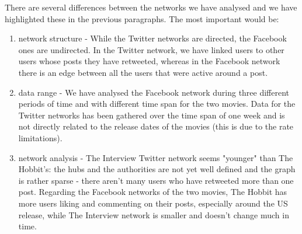 \documentclass{llncs}
\begin{document}
There are several differences between the networks we have analysed and we have
highlighted these in the previous paragraphs. The most important would be:
\begin{enumerate}
\item network structure - While the Twitter networks are directed, the Facebook
    ones are undirected. In the Twitter network, we have linked users to other
    users whose posts they have retweeted, whereas in the Facebook network there
    is an edge between all the users that were active around a post.
\item data range - We have analysed the Facebook network during three different
    periods of time and with different time span for the two movies. Data for
    the Twitter networks has been gathered over the time span of one week and is
    not directly related to the release dates of the movies (this is due to the
    rate limitations).
\item network analysis - The Interview Twitter network seems "younger" than The
    Hobbit's: the hubs and the authorities are not yet well defined and the
    graph is rather sparse - there aren't many users who have retweeted more
    than one post. Regarding the Facebook networks of the two movies, The Hobbit
    has more users liking and commenting on their posts, especially around the
    US release, while The Interview network is smaller and doesn't change much
    in time.
\end{enumerate}
%
\end{document}
